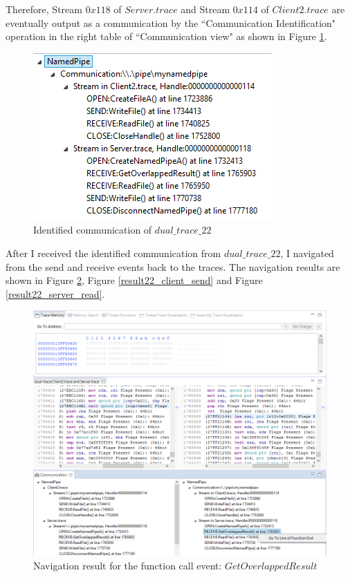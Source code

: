 Therefore, Stream $0x118$ of $Server.trace$ and Stream $0x114$ of $Client2.trace$ are eventually output as a communication by the ``Communication Identification" operation in the right table of ``Communication view" as shown in Figure \ref{result22_communications}. 

\begin{figure}[H]
\centerline{\includegraphics{Figures/result22_communications}}
 \caption{Identified communication of $dual\_trace\_22$}
\label{result22_communications}
\end{figure}

After I received the identified communication from $dual\_trace\_22$, I navigated from the send and receive events back to the traces. The navigation results are shown in Figure \ref{result22_server_readnull}, Figure \ref{result22_client_send} and Figure \ref{result22_server_read}.

\begin{figure}[H]
\centerline{\includegraphics[width=\textwidth]{Figures/result22_server_readnull}}
 \caption{Navigation result for the function call event: $GetOverlappedResult$}
\label{result22_server_readnull}
\end{figure}

